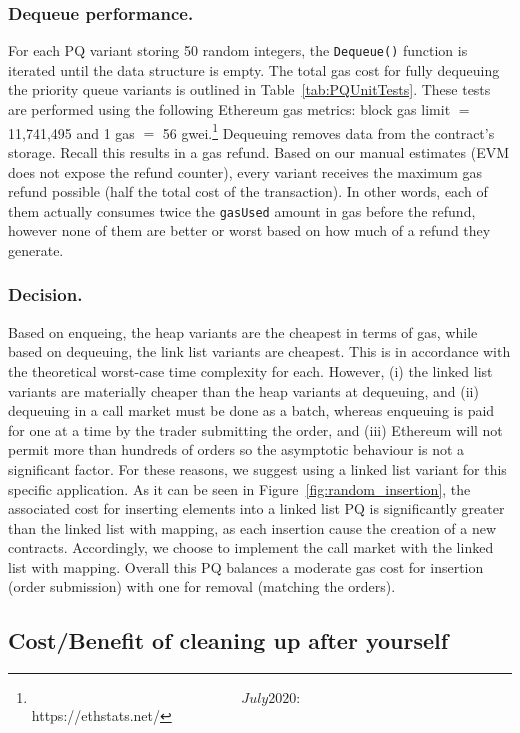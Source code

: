 \subsubsection{Dequeue performance.} For each PQ variant storing 50 random integers, the \texttt{Dequeue()} function is iterated until the data structure is empty. The total gas cost for fully dequeuing the priority queue variants is outlined in Table~\ref{tab:PQUnitTests}. These tests are performed using the following Ethereum gas metrics: block gas limit $=$11,741,495 and 1 gas $=$ 56 gwei.\footnote{\[July 2020:\] https://ethstats.net/} Dequeuing removes data from the contract's storage. Recall this results in a gas refund. Based on our manual estimates (EVM does not expose the refund counter), every variant receives the maximum gas refund possible (\ie half the total cost of the transaction). In other words, each of them actually consumes twice the \texttt{gasUsed} amount in gas before the refund, however none of them are better or worst based on how much of a refund they generate.  

\subsubsection{Decision.} Based on enqueing, the heap variants are the cheapest in terms of gas, while based on dequeuing, the link list variants are cheapest. This is in accordance with the theoretical worst-case time complexity for each. However, (i) the linked list variants are materially cheaper than the heap variants at dequeuing, and (ii) dequeuing in a call market must be done as a batch, whereas enqueuing is paid for one at a time by the trader submitting the order, and (iii) Ethereum will not permit more than hundreds of orders so the asymptotic behaviour is not a significant factor. For these reasons, we suggest using a linked list variant for this specific application. As it can be seen in Figure~\ref{fig:random_insertion}, the associated cost for inserting elements into a linked list PQ is significantly greater than the linked list with mapping, as each insertion cause the creation of a new contracts. Accordingly, we choose to implement the call market with the linked list with mapping. Overall this PQ balances a moderate gas cost for insertion (\ie order submission) with one for removal (\ie matching the orders). 



\subsection{Cost/Benefit of cleaning up after yourself}
\label{sec:LLvsLLMapping}
\label{sec:gasrefund}

